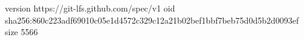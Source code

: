 version https://git-lfs.github.com/spec/v1
oid sha256:860c223adf69010c05e1d4572c329c12a21b02bef1bbf7beb75d0d5b2d0093ef
size 5566
